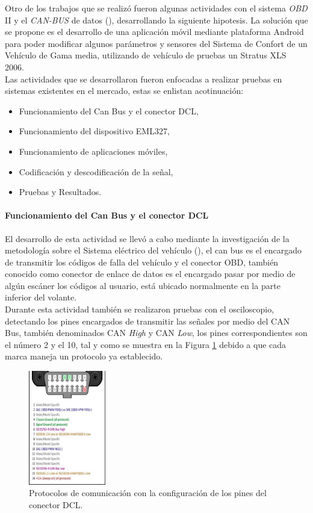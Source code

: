 Otro de los trabajos que se realizó fueron algunas actividades con el sistema \textit{OBD} II y el \textit{CAN-BUS} de datos (\cite{GB1}), desarrollando la siguiente hipotesis. La solución que se propone es el desarrollo de una aplicación móvil mediante plataforma Android para poder modificar algunos parámetros y sensores del Sistema de Confort de un Vehículo de Gama media, utilizando de vehículo de pruebas un Stratus XLS 2006. \\

Las actividades que se desarrollaron fueron enfocadas a realizar pruebas en sistemas existentes en el mercado, estas se enlistan acotinuación:

\begin{itemize}
\item Funcionamiento del Can Bus y el conector DCL,
\item Funcionamiento del dispositivo EML327,
\item Funcionamiento de aplicaciones móviles,
\item Codificación y descodificación de la señal,
\item Pruebas y Resultados.
\end{itemize}

\paragraph{Funcionamiento del Can Bus y el conector DCL}
El desarrollo de esta actividad se llevó a cabo mediante la investigación de la metodología sobre el Sistema eléctrico del vehículo (\cite{GB1}), el can bus es el encargado de transmitir los códigos de falla del vehículo y el conector OBD, también conocido como conector de enlace de datos es el encargado pasar por medio de algún escáner los códigos al usuario, está ubicado normalmente en la parte inferior del volante.\\

Durante esta actividad también se realizaron pruebas con el osciloscopio, detectando los pines encargados de transmitir las señales por medio del CAN Bus, también denominados CAN \textit{High} y CAN \textit{Low}, los pines correspondientes son el número 2 y el 10, tal y como se muestra en la Figura \ref{Medos} debido a que cada marca maneja un protocolo ya establecido.

%
\begin{figure}[H]
\centering
\includegraphics[width=0.3\textwidth]{metodologia/protocolos_obd.jpg}
\caption{Protocolos de comunicación con la configuración de los pines del conector DCL.}
\label{Medos}
\end{figure}
%

